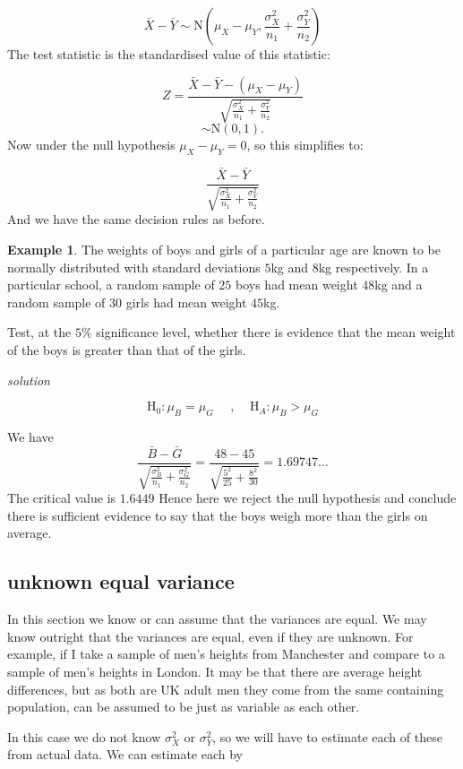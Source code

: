 \documentclass[
]{book}
\theoremstyle{definition}
\theoremstyle{definition}
\newtheorem{example}{Example}[chapter]
\theoremstyle{definition}
\theoremstyle{definition}
\theoremstyle{remark}
\begin{document}
\[\bar{X}-\bar{Y} \sim \text{N}\left(\mu_X-\mu_Y , \frac{\sigma_X^2}{n_1} + \frac{\sigma_Y^2}{n_2}\right)\]
The test statistic is the standardised value of this statistic:

\[Z = \frac{\bar{X} - \bar{Y} - (\mu_X-\mu_Y)}{\sqrt{\frac{\sigma_X^2}{n_1} + \frac{\sigma_Y^2}{n_2}}}\]
\[\sim\text{N}(0,1).\]
Now under the null hypothesis \(\mu_X-\mu_Y = 0\), so this simplifies to:

\[\frac{\bar{X} - \bar{Y}}{\sqrt{\frac{\sigma_X^2}{n_1} + \frac{\sigma_Y^2}{n_2}}}\]
And we have the same decision rules as before.

\begin{example}
The weights of boys and girls of a particular age are known to be normally distributed with standard deviations \(5\)kg and \(8\)kg respectively. In a particular school, a random sample of \(25\) boys had mean weight \(48\)kg and a random sample of \(30\) girls had mean weight \(45\)kg.

Test, at the \(5\%\) significance level, whether there is evidence that the mean weight of the boys is greater than that of the girls.

\emph{solution}

\[\text{H}_0: \mu_B = \mu_G \ \ \ \ \ \ , \ \ \ \ \ \text{H}_A:\mu_B > \mu_G\]

We have
\[\frac{\bar{B}-\bar{G}}{\sqrt{\frac{\sigma_B^2}{n_1} + \frac{\sigma_G^2}{n_2}}}= \frac{48-45}{\sqrt{\frac{5^2}{25}+\frac{8^2}{30}}}= 1.69747\ldots \]
The critical value is \(1.6449\)
Hence here we reject the null hypothesis and conclude there is sufficient evidence to say that the boys weigh more than the girls on average.
\end{example}

\hypertarget{unknown-equal-variance}{%
\subsection{unknown equal variance}\label{unknown-equal-variance}}

In this section we know or can assume that the variances are equal. We may know outright that the variances are equal, even if they are unknown. For example, if I take a sample of men's heights from Manchester and compare to a sample of men's heights in London. It may be that there are average height differences, but as both are UK adult men they come from the same containing population, can be assumed to be just as variable as each other.

In this case we do not know \(\sigma_X^2\) or \(\sigma_Y^2\), so we will have to estimate each of these from actual data. We can estimate each by
\end{document}

